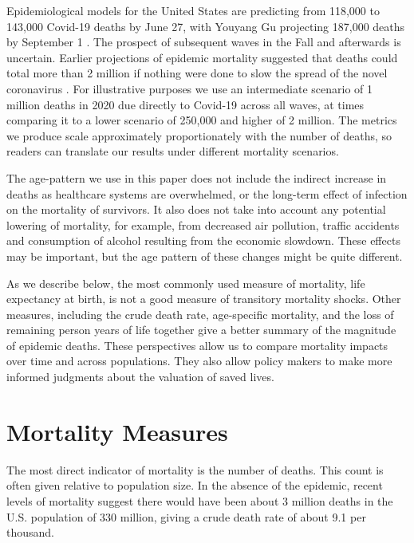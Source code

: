 \documentclass[9pt,twocolumn,twoside,lineno]{pnas-new}
\begin{document}
Epidemiological models for the United States are predicting from
118,000 to 143,000 Covid-19 deaths by June 27, with Youyang Gu
projecting 187,000 deaths by September 1 \cite{cdc:2020}. The prospect
of subsequent waves in the Fall and afterwards is uncertain. Earlier
projections of epidemic mortality suggested that deaths could total
more than 2 million if nothing were done to slow the spread of the
novel coronavirus \cite{ferguson:2020}.  For illustrative purposes we
use an intermediate scenario of 1 million deaths in 2020 due directly
to Covid-19 across all waves, at times comparing it to a lower
scenario of 250,000 and higher of 2 million. The metrics we produce
scale approximately proportionately with the number of deaths, so readers
can translate our results under different mortality scenarios.

The age-pattern we use in this paper does not include the indirect
increase in deaths as healthcare systems are overwhelmed, or the
long-term effect of infection on the mortality of survivors. It also
does not take into account any potential lowering of mortality, for
example, from decreased air pollution, traffic accidents and
consumption of alcohol resulting from the economic slowdown. These
effects may be important, but the age pattern of these changes might
be quite different.

As we describe below, the most commonly used measure of mortality,
life expectancy at birth, is not a good measure of transitory
mortality shocks. Other measures, including the crude death rate,
age-specific mortality, and the loss of remaining person years of life
together give a better summary of the magnitude of epidemic
deaths. These perspectives allow us to compare mortality impacts over
time and across populations. They also allow policy makers to make
more informed judgments about the valuation of saved lives.

\section*{Mortality Measures}

The most direct indicator of mortality is the number of deaths. This
count is often given relative to population size. In the absence of
the epidemic, recent levels of mortality suggest there would have been
about 3 million deaths in the U.S. population of 330 million,
giving a crude death rate of about 9.1 per thousand.
\end{document}
